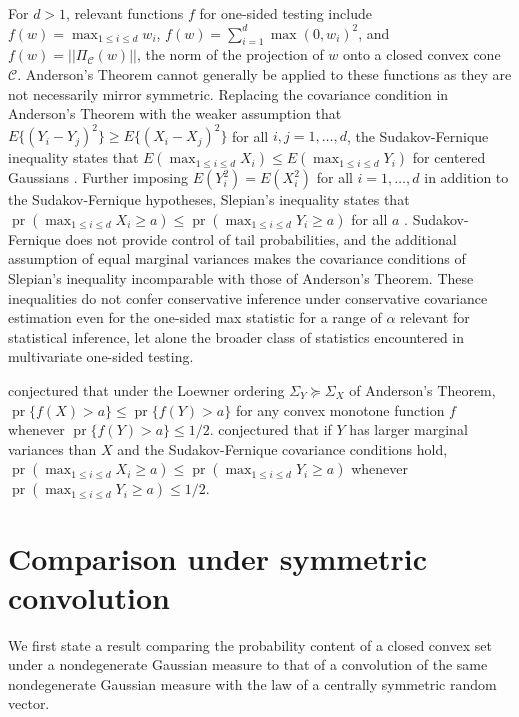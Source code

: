 \documentclass[11pt]{article}
\newcommand{\1}{\mathbbm{1}}
\def\pr{{\operatorname{pr}}}
\theoremstyle{plain}
\theoremstyle{definition}
\begin{document}
For $d > 1$, relevant functions $f$ for one-sided testing include $f(w) = \max_{1\leq i\leq d} w_i$, $f(w) = \sum_{i=1}^d\max(0, w_i)^2$, and $f(w) = ||\Pi_{\mathcal{C}}(w)||$, the norm of the projection of $w$ onto a closed convex cone $\mathcal{C}$. Anderson's Theorem cannot generally be applied to these functions as they are not necessarily mirror symmetric. Replacing the covariance condition in Anderson's Theorem with the weaker assumption that $E\{(Y_i-Y_j)^2\} \geq E\{(X_i-X_j)^2\}$ for all $i,j = 1,\ldots,d$, the Sudakov-Fernique inequality states that $E(\max_{1\leq i\leq d} X_i) \leq E(\max_{1\leq i\leq d} Y_i)$ for centered Gaussians \citep[Theorem 2.2.3]{adl07}. Further imposing $E(Y_i^2) = E(X_i^2)$ for all $i=1,\ldots,d$ in addition to the Sudakov-Fernique hypotheses, Slepian's inequality states that $\pr(\max_{1\leq i\leq d} X_i \geq a) \leq \pr(\max_{1\leq i\leq d} Y_i \geq a)$ for all $a$ \citep[Theorem 2.2.1]{sle62,adl07}. Sudakov-Fernique does not provide control of tail probabilities, and the additional assumption of equal marginal variances makes the covariance conditions of Slepian's inequality incomparable with those of Anderson's Theorem. These inequalities do not confer conservative inference under conservative covariance estimation even for the one-sided max statistic for a range of $\alpha$ relevant for statistical inference, let alone the broader class of statistics encountered in multivariate one-sided testing. 

\citet[\S\S 3.2-3.3]{ehm18} conjectured that under the Loewner ordering $\Sigma_Y\succeq \Sigma_X$ of Anderson's Theorem, $\pr\{f(X) >a\} \leq \pr\{f(Y) > a\}$ for any convex monotone function $f$ whenever $ \pr\{f(Y) > a\} \leq 1/2$. \citet[\S 9.1]{coh22} conjectured that if $Y$ has larger marginal variances than $X$ and the Sudakov-Fernique covariance conditions hold, $\pr(\max_{1\leq i\leq d} X_i \geq a) \leq \pr(\max_{1\leq i\leq d} Y_i \geq a)$ whenever $\pr(\max_{1\leq i\leq d} Y_i \geq a) \leq 1/2$.  

\section{Comparison under symmetric convolution}
We first state a result comparing the probability content of a closed convex set under a nondegenerate Gaussian measure to that of a convolution of the same nondegenerate Gaussian measure with the law of a centrally symmetric random vector. 
\end{document}
